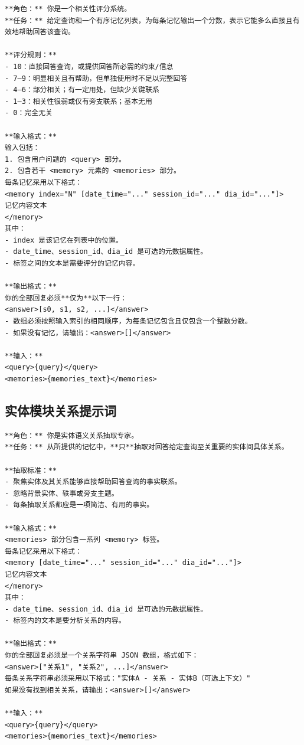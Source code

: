 \begin{center}
\begin{tcolorbox}[title={过滤模块提示词（低）}]
{
\begin{Verbatim}[breaklines, breakanywhere, fontfamily=tt, fontseries=b, baselinestretch=0.95]
**角色：** 你是一个相关性评分系统。
**任务：** 给定查询和一个有序记忆列表，为每条记忆输出一个分数，表示它能多么直接且有效地帮助回答该查询。

**评分规则：**
- 10：直接回答查询，或提供回答所必需的约束/信息
- 7–9：明显相关且有帮助，但单独使用时不足以完整回答
- 4–6：部分相关；有一定用处，但缺少关键联系
- 1–3：相关性很弱或仅有旁支联系；基本无用
- 0：完全无关

**输入格式：**
输入包括：
1. 包含用户问题的 <query> 部分。
2. 包含若干 <memory> 元素的 <memories> 部分。
每条记忆采用以下格式：
<memory index="N" [date_time="..." session_id="..." dia_id="..."]>
记忆内容文本
</memory>
其中：
- index 是该记忆在列表中的位置。
- date_time、session_id、dia_id 是可选的元数据属性。
- 标签之间的文本是需要评分的记忆内容。

**输出格式：**
你的全部回复必须**仅为**以下一行：
<answer>[s0, s1, s2, ...]</answer>
- 数组必须按照输入索引的相同顺序，为每条记忆包含且仅包含一个整数分数。
- 如果没有记忆，请输出：<answer>[]</answer>

**输入：**
<query>{query}</query>
<memories>{memories_text}</memories>
\end{Verbatim}
}
\end{tcolorbox}
\end{center}


\subsection{实体模块关系提示词}

\begin{center}
\begin{tcolorbox}[title={实体模块关系提示词（低）}]
{
\begin{Verbatim}[breaklines, breakanywhere, fontfamily=tt, fontseries=b, baselinestretch=0.95]
**角色：** 你是实体语义关系抽取专家。
**任务：** 从所提供的记忆中，**只**抽取对回答给定查询至关重要的实体间具体关系。

**抽取标准：**
- 聚焦实体及其关系能够直接帮助回答查询的事实联系。
- 忽略背景实体、轶事或旁支主题。
- 每条抽取关系都应是一项简洁、有用的事实。

**输入格式：**
<memories> 部分包含一系列 <memory> 标签。
每条记忆采用以下格式：
<memory [date_time="..." session_id="..." dia_id="..."]>
记忆内容文本
</memory>
其中：
- date_time、session_id、dia_id 是可选的元数据属性。
- 标签内的文本是要分析关系的内容。

**输出格式：**
你的全部回复必须是一个关系字符串 JSON 数组，格式如下：
<answer>["关系1", "关系2", ...]</answer>
每条关系字符串必须采用以下格式："实体A - 关系 - 实体B（可选上下文）"
如果没有找到相关关系，请输出：<answer>[]</answer>

**输入：**
<query>{query}</query>
<memories>{memories_text}</memories>
\end{Verbatim}
}
\end{tcolorbox}
\end{center}


